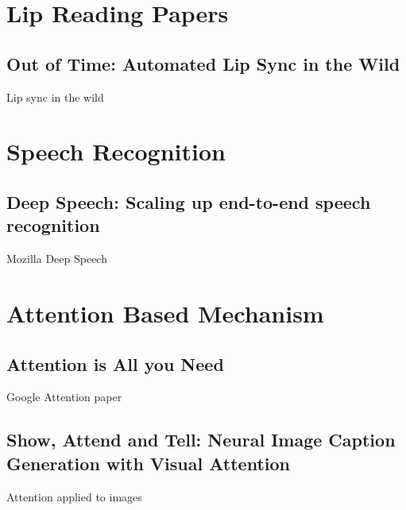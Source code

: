\documentclass[12pt]{article}
\begin{document}
\section{Lip Reading Papers}
\subsection{Out of Time: Automated Lip Sync in the Wild}
Lip sync in the wild \cite{Chung2016}

\section{Speech Recognition}
\subsection{Deep Speech: Scaling up end-to-end speech recognition}
Mozilla Deep Speech \cite{Hannun2014}

\section{Attention Based Mechanism}
\subsection{Attention is All you Need}
Google Attention paper \cite{Vaswani2017}

\subsection{Show, Attend and Tell: Neural Image Caption Generation with Visual
Attention}
Attention applied to images \cite{Xu2015}





\end{document}
